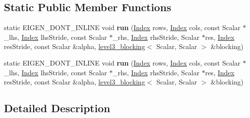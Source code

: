 \subsection*{Static Public Member Functions}
\begin{DoxyCompactItemize}
\item 
\mbox{\label{struct_eigen_1_1internal_1_1product__selfadjoint__matrix_3_01_scalar_00_01_index_00_01_lhs_storadd08b9e76d992b3a954c3041feed2ed9_aa181c8e17f9aecd48411371d2a3fdc8a}} 
static E\+I\+G\+E\+N\+\_\+\+D\+O\+N\+T\+\_\+\+I\+N\+L\+I\+NE void {\bfseries run} (\hyperlink{namespace_eigen_a62e77e0933482dafde8fe197d9a2cfde}{Index} rows, \hyperlink{namespace_eigen_a62e77e0933482dafde8fe197d9a2cfde}{Index} cols, const Scalar $\ast$\+\_\+lhs, \hyperlink{namespace_eigen_a62e77e0933482dafde8fe197d9a2cfde}{Index} lhs\+Stride, const Scalar $\ast$\+\_\+rhs, \hyperlink{namespace_eigen_a62e77e0933482dafde8fe197d9a2cfde}{Index} rhs\+Stride, Scalar $\ast$res, \hyperlink{namespace_eigen_a62e77e0933482dafde8fe197d9a2cfde}{Index} res\+Stride, const Scalar \&alpha, \hyperlink{class_eigen_1_1internal_1_1level3__blocking}{level3\+\_\+blocking}$<$ Scalar, Scalar $>$ \&blocking)
\item 
\mbox{\label{struct_eigen_1_1internal_1_1product__selfadjoint__matrix_3_01_scalar_00_01_index_00_01_lhs_storadd08b9e76d992b3a954c3041feed2ed9_a64c7524e3e1a529f62d554f35695f861}} 
static E\+I\+G\+E\+N\+\_\+\+D\+O\+N\+T\+\_\+\+I\+N\+L\+I\+NE void {\bfseries run} (\hyperlink{namespace_eigen_a62e77e0933482dafde8fe197d9a2cfde}{Index} rows, \hyperlink{namespace_eigen_a62e77e0933482dafde8fe197d9a2cfde}{Index} cols, const Scalar $\ast$\+\_\+lhs, \hyperlink{namespace_eigen_a62e77e0933482dafde8fe197d9a2cfde}{Index} lhs\+Stride, const Scalar $\ast$\+\_\+rhs, \hyperlink{namespace_eigen_a62e77e0933482dafde8fe197d9a2cfde}{Index} rhs\+Stride, Scalar $\ast$res, \hyperlink{namespace_eigen_a62e77e0933482dafde8fe197d9a2cfde}{Index} res\+Stride, const Scalar \&alpha, \hyperlink{class_eigen_1_1internal_1_1level3__blocking}{level3\+\_\+blocking}$<$ Scalar, Scalar $>$ \&blocking)
\end{DoxyCompactItemize}


\subsection{Detailed Description}
